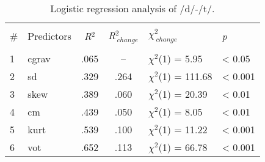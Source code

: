 \begin{table}[ht]
\centering
{\footnotesize{
{\footnotesize{\caption{Logistic regression analysis of /d/-/t/.\label{model_sum}}}}
\begin{tabular}{@{}llccll@{}}

\hline \\ [-1ex]
\#  & Predictors    & \emph{R}$^2$ & \emph{R}$^2_{\ change}$ & \emph{$\chi^2_{\ change}$} & \emph{p} \\ [1ex]
\hline \\ [-1ex]
1   & cgrav         & .065  & --   & $\chi^2$(1) = 5.95   & < 0.05  \\
2   & sd            & .329  & .264 & $\chi^2$(1) = 111.68 & < 0.001 \\
3   & skew          & .389  & .060 & $\chi^2$(1) = 20.39  & < 0.01  \\
4   & cm            & .439  & .050 & $\chi^2$(1) = 8.05   & < 0.01  \\
5   & kurt          & .539  & .100 & $\chi^2$(1) = 11.22  & < 0.001  \\
6   & vot           & .652  & .113 & $\chi^2$(1) = 66.78  & < 0.001 \\ [1ex]
\hline
\end{tabular}
}}
\vspace{.05in}
\end{table}
